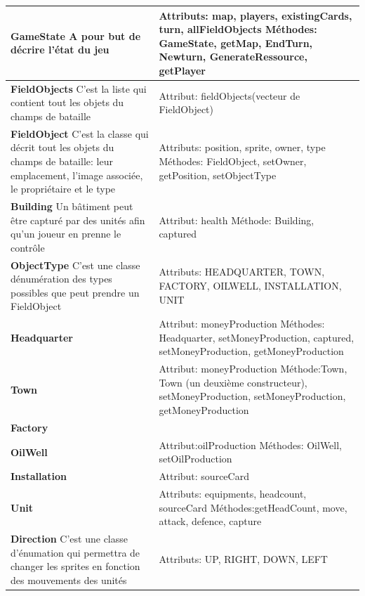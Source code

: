 \begin{tabularx}{15 cm}{|X|X|}
\hline
\textbf{GameState} \newline A pour but de décrire l'état du jeu & Attributs: map, players, existingCards, turn, allFieldObjects \newline Méthodes: GameState, getMap, EndTurn, Newturn, GenerateRessource, getPlayer\\ 
\hline
\textbf{FieldObjects} \newline C'est la liste qui contient tout les objets du champs de bataille & Attribut: fieldObjects(vecteur de FieldObject) \\
\hline
\textbf{FieldObject} \newline C'est la classe qui décrit tout les objets du champs de bataille: leur emplacement, l'image associée, le propriétaire et le type  & Attributs: position, sprite, owner, type \newline Méthodes: FieldObject, setOwner, getPosition, setObjectType\\
\hline
\textbf{Building} \newline Un bâtiment peut être capturé par des unités afin qu'un joueur en prenne le contrôle & Attribut: health \newline Méthode: Building, captured\\
\hline
\textbf{ObjectType} \newline C'est une classe dénumération des types possibles que peut prendre un FieldObject & Attributs: HEADQUARTER, TOWN, FACTORY, OILWELL, INSTALLATION, UNIT \newline \\
\hline
\textbf{Headquarter} & Attribut: moneyProduction \newline Méthodes: Headquarter, setMoneyProduction, captured, setMoneyProduction, getMoneyProduction\\
\hline
\textbf{Town} & Attribut: moneyProduction \newline Méthode:Town, Town (un deuxième constructeur), setMoneyProduction, setMoneyProduction, getMoneyProduction\\
\hline
\textbf{Factory} &  
\newline\\
\hline
\textbf{OilWell} & Attribut:oilProduction \newline Méthodes: OilWell, setOilProduction\\
\hline
\textbf{Installation} & Attribut: sourceCard \newline\\
\hline
\textbf{Unit} & Attributs: equipments, headcount, sourceCard \newline Méthodes:getHeadCount, move, attack, defence, capture\\

\hline
\textbf{Direction} \newline C'est une classe d'énumation qui permettra de changer les sprites en fonction des mouvements des unités & Attributs: UP, RIGHT, DOWN, LEFT \newline \\
\hline

\end{tabularx}



